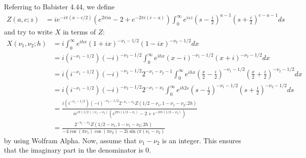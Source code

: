 \documentclass[11pt]{article}
\begin{document}
Referring to Babister 4.44, we define \begin{align*}
Z(a,c;z) &= ie^{-i\pi(a - c/2)}(e^{2\pi i a}- 2 + e^{-2\pi i(c-a)})\int_0^\infty e^{isz}\left(s-\frac{i}{2}\right)^{a-1}\left(s + \frac{i}{2}\right)^{c-a-1} ds 
\end{align*}and try to write $X$ in terms of $Z$:
\begin{align*}
X(\nu_1, \nu_2; h) &= i\int_0^\infty e^{ihx} (1 + ix)^{-\nu_1 - 1/2}(1 -ix)^{-\nu_2-1/2} dx \\
&=i(i^{-\nu_1 - 1/2})(-i)^{-\nu_2 - 1/2} \int_0^\infty e^{ihx}(x-i)^{-\nu_1 - 1/2} (x + i)^{-\nu_2 - 1/2} dx \\
&=i(i^{-\nu_1 - 1/2})(-i)^{-\nu_2 - 1/2} 2^{-\nu_1 - \nu_2 - 1}\int_0^\infty e^{ihx}\left(\frac{x}{2}-\frac{i}{2}\right)^{-\nu_1 - 1/2} \left(\frac{x}{2} + \frac{i}{2}\right)^{-\nu_2 - 1/2} dx\\
&=i(i^{-\nu_1 - 1/2})(-i)^{-\nu_2 - 1/2} 2^{-\nu_1 - \nu_2}\int_0^\infty e^{ih2s}\left(s-\frac{i}{2}\right)^{-\nu_1 - 1/2} \left(s + \frac{i}{2}\right)^{-\nu_2 - 1/2} ds\\
&=\frac{i(i^{-\nu_1 - 1/2})(-i)^{-\nu_2 - 1/2} 2^{-\nu_1 - \nu_2}Z(1/2 - \nu_1, 1- \nu_1 - \nu_2; 2h)}{ie^{i \pi(1/2)(\nu_1 - \nu_2)}(e^{2\pi i (1/2 - \nu_1)} - 2+ e^{-2\pi i (1/2 - \nu_2)}) }\\
&=\frac{2^{-\nu_1 - \nu_2}Z(1/2 - \nu_1, 1- \nu_1 - \nu_2; 2h)}{-4\cos(\pi \nu_1)\cos(\pi \nu_2) - 2 i \sin(\pi (\nu_1 - \nu_2)}
\end{align*}by using Wolfram Alpha. Now, assume that $\nu_1 - \nu_2$ is an integer. This ensures that the imaginary part in the denominator is $0$.
\end{document}
